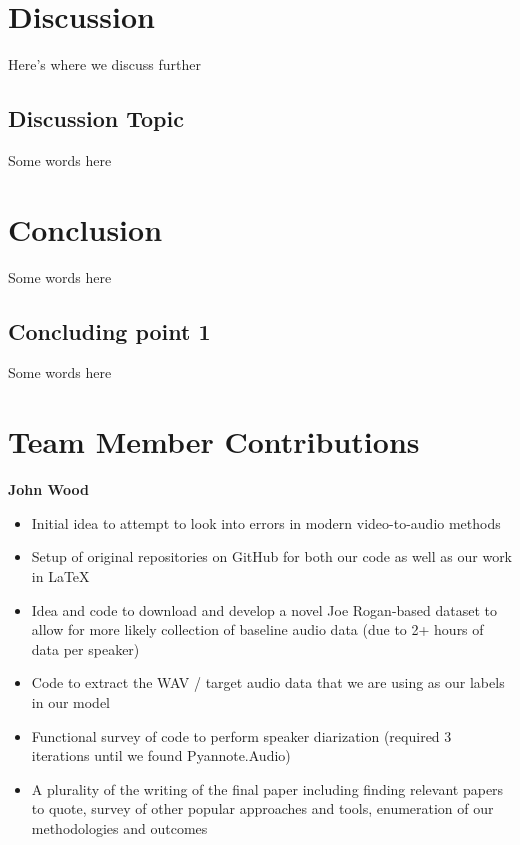 \documentclass[10pt,twocolumn,letterpaper]{article}
\begin{document}
\section{Discussion}
\label{sec:discussion}

Here's where we discuss further

\subsection{Discussion Topic}

Some words here

\section{Conclusion}
\label{sec:conclusion}

Some words here

\subsection{Concluding point 1}

Some words here


\section{Team Member Contributions}
\label{sec:conclusion}
\textbf{{John Wood}}
\begin{itemize}
    \item Initial idea to attempt to look into errors in modern video-to-audio methods
    \item Setup of original repositories on GitHub for both our code as well as our work in \LaTeX 
    \item Idea and code to download and develop a novel Joe Rogan-based dataset to allow for more likely collection of baseline audio data (due to 2+ hours of data per speaker)
    \item Code to extract the WAV / target audio data that we are using as our labels in our model
    \item Functional survey of code to perform speaker diarization (required 3 iterations until we found Pyannote.Audio)
    \item A plurality of the writing of the final paper including finding relevant papers to quote,  survey of other popular approaches and tools, enumeration of our methodologies and outcomes
\end{itemize}
\end{document}

